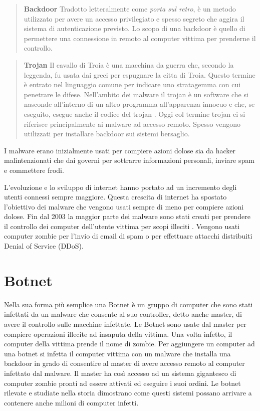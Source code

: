 \documentclass[../main.tex]{subfiles}
\begin{document}
\begin{verse}
				\textbf{Backdoor} Tradotto letteralmente come \textit{porta sul retro}, è un metodo utilizzato per avere un accesso privilegiato e spesso segreto che aggira il sistema di autenticazione previsto. Lo scopo di una backdoor è quello di permettere una connessione in remoto al computer vittima per prenderne il controllo.				
\end{verse}

\begin{verse}
				\textbf{Trojan} Il cavallo di Troia è una macchina da guerra che, secondo la leggenda, fu usata dai greci per espugnare la citta di Troia. Questo termine è entrato nel linguaggio comune per indicare uno stratagemma con cui penetrare le difese. Nell'ambito dei malware il trojan è un software che si nasconde all'interno di un altro programma all'apparenza innocuo e che, se eseguito, esegue anche il codice del trojan \cite{TrojanDef}.
				Oggi col termine trojan ci si riferisce principalmente ai malware ad accesso remoto. Spesso vengono utilizzati per installare backdoor sui sistemi bersaglio. \cite{TrojanPurpose}
\end{verse}

I malware erano inizialmente usati per compiere azioni dolose sia da hacker malintenzionati che dai governi per sottrarre informazioni personali, inviare spam e commettere frodi. \cite{ScopoMalware} \cite{MalwareRevolution}

L'evoluzione e lo sviluppo di internet hanno portato ad un incremento degli utenti connessi sempre maggiore. Questa crescita di internet ha spostato l'obiettivo dei malware che vengono usati sempre di meno per compiere azioni dolose. Fin dal 2003 la maggior parte dei malware sono stati creati per prendere il controllo dei computer dell'utente vittima per scopi illeciti \cite{MalwareRevolution}. Vengono usati computer zombie per l'invio di email di spam o per effettuare attacchi distribuiti Denial of Service (DDoS).


\section{Botnet}
Nella sua forma più semplice una Botnet è un gruppo di computer che sono stati infettati da un malware che consente al suo controller, detto anche master, di avere il controllo sulle macchine infettate. Le Botnet sono usate dal master per compiere operazioni illecite ad insaputa della vittima. Una volta infetto, il computer della vittima prende il nome di zombie. \cite{Botnet} \newline
Per aggiungere un computer ad una botnet si infetta il computer vittima con un malware che installa una backdoor in grado di consentire al master di avere accesso remoto al computer infettato dal malware.
Il master ha così accesso ad un sistema gigantesco di computer zombie pronti ad essere attivati ed eseguire i suoi ordini. Le botnet rilevate e studiate nella storia dimostrano come questi sistemi possano arrivare a contenere anche milioni di computer infetti. \cite{Botnet}
\end{document}
